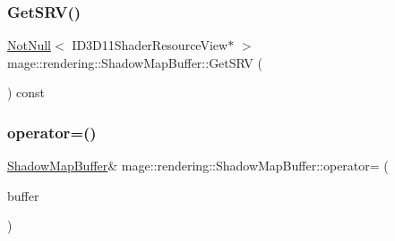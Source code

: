 \hypertarget{classmage_1_1rendering_1_1_shadow_map_buffer_a22caadf338e87eac69eb9e4297426bf7}{}\label{classmage_1_1rendering_1_1_shadow_map_buffer_a22caadf338e87eac69eb9e4297426bf7} 
\subsubsection{\texorpdfstring{Get\+S\+R\+V()}{GetSRV()}}
{\footnotesize\ttfamily \hyperlink{namespacemage_a8769f9d670d6b585ea306cb1062af94b}{Not\+Null}$<$ I\+D3\+D11\+Shader\+Resource\+View$\ast$ $>$ mage\+::rendering\+::\+Shadow\+Map\+Buffer\+::\+Get\+S\+RV (\begin{DoxyParamCaption}{ }\end{DoxyParamCaption}) const\hspace{0.3cm}{\ttfamily [noexcept]}}

\hypertarget{classmage_1_1rendering_1_1_shadow_map_buffer_a51f61c027adeb55d39767f1be36dd404}{}\label{classmage_1_1rendering_1_1_shadow_map_buffer_a51f61c027adeb55d39767f1be36dd404} 
\subsubsection{\texorpdfstring{operator=()}{operator=()}\hspace{0.1cm}{\footnotesize\ttfamily [1/2]}}
{\footnotesize\ttfamily \hyperlink{classmage_1_1rendering_1_1_shadow_map_buffer}{Shadow\+Map\+Buffer}\& mage\+::rendering\+::\+Shadow\+Map\+Buffer\+::operator= (\begin{DoxyParamCaption}\item[{const \hyperlink{classmage_1_1rendering_1_1_shadow_map_buffer}{Shadow\+Map\+Buffer} \&}]{buffer }\end{DoxyParamCaption})\hspace{0.3cm}{\ttfamily [delete]}}

\hypertarget{classmage_1_1rendering_1_1_shadow_map_buffer_a09a2616afc836a3c8c21347a4473eb08}{}\label{classmage_1_1rendering_1_1_shadow_map_buffer_a09a2616afc836a3c8c21347a4473eb08} 
